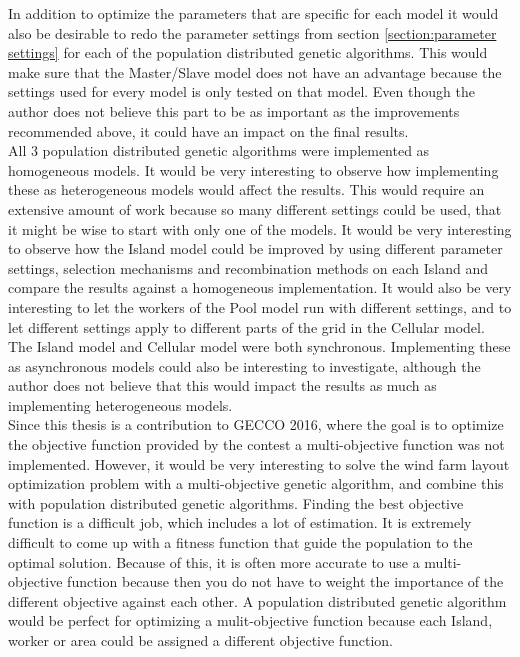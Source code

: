 \noindent In addition to optimize the parameters that are specific for each model it would also be desirable to redo the parameter settings from section \ref{section:parameter settings} for each of the population distributed genetic algorithms. This would make sure that the Master/Slave model does not have an advantage because the settings used for every model is only tested on that model. Even though the author does not believe this part to be as important as the improvements  recommended above, it could have an impact on the final results. \\


\noindent All 3 population distributed genetic algorithms were implemented as homogeneous models. It would be very interesting to observe how implementing these as heterogeneous models would affect the results. This would require an extensive amount of work because so many different settings could be used, that it might be wise to start with only one of the models. It would be very interesting to observe how the Island model could be improved by using different parameter settings, selection mechanisms and recombination methods on each Island and compare the results against a homogeneous implementation. It would also be very interesting to let the workers of the Pool model run with different settings, and to let different settings apply to different parts of the grid in the Cellular model.\\


\noindent The Island model and Cellular model were both synchronous. Implementing these as asynchronous models could also be interesting to investigate, although the author does not believe that this would impact the results as much as implementing heterogeneous models.\\


\noindent Since this thesis is a contribution to GECCO 2016, where the goal is to optimize the objective function provided by the contest a multi-objective function was not implemented. However, it would be very interesting to solve the wind farm layout optimization problem with a multi-objective genetic algorithm, and combine this with population distributed genetic algorithms. Finding the best objective function is a difficult job, which includes a lot of estimation. It is extremely difficult to come up with a fitness function that guide the population to the optimal solution. Because of this, it is often more accurate to use a multi-objective function because then you do not have to weight the importance of the different objective against each other. A population distributed genetic algorithm would be perfect for optimizing a mulit-objective function because each Island, worker or area could be assigned a different objective function.\\


